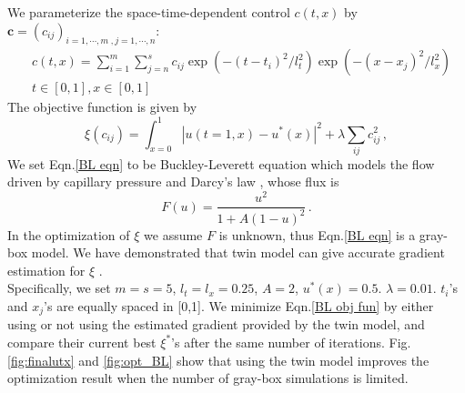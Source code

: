 \documentclass[a4paper,onecolumn]{article}
\theoremstyle{remark}
\begin{document}
We parameterize the space-time-dependent control
$c(t,x)$ by $\mathbf{c}=(c_{ij})_{i=1,\cdots,m\;,j=1,\cdots,n}$:
\begin{equation}\begin{split}
    &c(t,x) = \sum_{i=1}^m \sum_{j=n}^s c_{ij}\exp\left(-(t-t_i)^2/l_t^2\right)
    \exp\left(-(x-x_j)^2/l_x^2\right)\\
    &t\in[0,1], x\in[0,1]
\end{split}\end{equation}
The objective function is given by
\begin{equation}
    \xi(c_{ij}) = \int_{x=0}^1 \left| u(t=1,x) -  u^*(x)\right|^2 + \lambda\sum_{ij} c_{ij}^2\,,
    \label{BL obj fun}
\end{equation}
We set Eqn.\eqref{BL eqn} to be Buckley-Leverett equation which models the flow driven by 
capillary pressure and Darcy's law \cite{Buckley Leverett}, whose flux is
\begin{equation}
    F(u) = \frac{u^2}{1+A(1-u)^2}\,.
    \label{BL flux}
\end{equation}
In the optimization of $\xi$ we assume $F$ is unknown, thus Eqn.\eqref{BL eqn} is a gray-box model.
We have demonstrated that twin model can give accurate gradient estimation for $\xi$ \cite{twin model}.\\

Specifically, we set $m=s=5$, $l_t=l_x=0.25$, $A=2$, $u^*(x) = 0.5$. $\lambda=0.01$.
$t_i$'s and $x_j$'s are equally spaced in [0,1].
We minimize Eqn.\eqref{BL obj fun} by either using or not using the estimated gradient provided
by the twin model, and compare their current best $\xi^*$'s after the same number of iterations.
Fig.\ref{fig:finalutx} and \ref{fig:opt_BL} show that using the twin model improves the optimization
result when the number of gray-box simulations is limited.
\\
\end{document}
